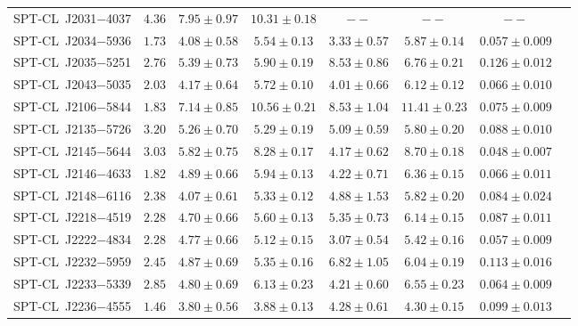 \begin{table}
{\begin{tabular}{lccccccc}
    SPT-CL~J2031$-$4037    &$ 4.36 $    &$ 7.95 \pm 0.97 $    &$ 10.31 \pm 0.18 $    &$       --      $     &$       --      $    &$       --      $    \\ 
    SPT-CL~J2034$-$5936    &$ 1.73 $    &$ 4.08 \pm 0.58 $    &$ 5.54 \pm 0.13 $    &$ 3.33 \pm 0.57 $     &$ 5.87 \pm 0.14 $    &$ 0.057 \pm 0.009 $    \\ 
    SPT-CL~J2035$-$5251    &$ 2.76 $    &$ 5.39 \pm 0.73 $    &$ 5.90 \pm 0.19 $    &$ 8.53 \pm 0.86 $     &$ 6.76 \pm 0.21 $    &$ 0.126 \pm 0.012 $    \\ 
    SPT-CL~J2043$-$5035    &$ 2.03 $    &$ 4.17 \pm 0.64 $    &$ 5.72 \pm 0.10 $    &$ 4.01 \pm 0.66 $     &$ 6.12 \pm 0.12 $    &$ 0.066 \pm 0.010 $    \\ 
    SPT-CL~J2106$-$5844    &$ 1.83 $    &$ 7.14 \pm 0.85 $    &$ 10.56 \pm 0.21 $    &$ 8.53 \pm 1.04 $     &$ 11.41 \pm 0.23 $    &$ 0.075 \pm 0.009 $    \\ 
    SPT-CL~J2135$-$5726    &$ 3.20 $    &$ 5.26 \pm 0.70 $    &$ 5.29 \pm 0.19 $    &$ 5.09 \pm 0.59 $     &$ 5.80 \pm 0.20 $    &$ 0.088 \pm 0.010 $    \\ 
    SPT-CL~J2145$-$5644    &$ 3.03 $    &$ 5.82 \pm 0.75 $    &$ 8.28 \pm 0.17 $    &$ 4.17 \pm 0.62 $     &$ 8.70 \pm 0.18 $    &$ 0.048 \pm 0.007 $    \\ 
    SPT-CL~J2146$-$4633    &$ 1.82 $    &$ 4.89 \pm 0.66 $    &$ 5.94 \pm 0.13 $    &$ 4.22 \pm 0.71 $     &$ 6.36 \pm 0.15 $    &$ 0.066 \pm 0.011 $    \\ 
    SPT-CL~J2148$-$6116    &$ 2.38 $    &$ 4.07 \pm 0.61 $    &$ 5.33 \pm 0.12 $    &$ 4.88 \pm 1.53 $     &$ 5.82 \pm 0.20 $    &$ 0.084 \pm 0.024 $    \\ 
    SPT-CL~J2218$-$4519    &$ 2.28 $    &$ 4.70 \pm 0.66 $    &$ 5.60 \pm 0.13 $    &$ 5.35 \pm 0.73 $     &$ 6.14 \pm 0.15 $    &$ 0.087 \pm 0.011 $    \\ 
    SPT-CL~J2222$-$4834    &$ 2.28 $    &$ 4.77 \pm 0.66 $    &$ 5.12 \pm 0.15 $    &$ 3.07 \pm 0.54 $     &$ 5.42 \pm 0.16 $    &$ 0.057 \pm 0.009 $    \\ 
    SPT-CL~J2232$-$5959    &$ 2.45 $    &$ 4.87 \pm 0.69 $    &$ 5.35 \pm 0.16 $    &$ 6.82 \pm 1.05 $     &$ 6.04 \pm 0.19 $    &$ 0.113 \pm 0.016 $    \\ 
    SPT-CL~J2233$-$5339    &$ 2.85 $    &$ 4.80 \pm 0.69 $    &$ 6.13 \pm 0.23 $    &$ 4.21 \pm 0.60 $     &$ 6.55 \pm 0.23 $    &$ 0.064 \pm 0.009 $    \\ 
    SPT-CL~J2236$-$4555    &$ 1.46 $    &$ 3.80 \pm 0.56 $    &$ 3.88 \pm 0.13 $    &$ 4.28 \pm 0.61 $     &$ 4.30 \pm 0.15 $    &$ 0.099 \pm 0.013 $    \\ 

\end{tabular}}
\end{table}
